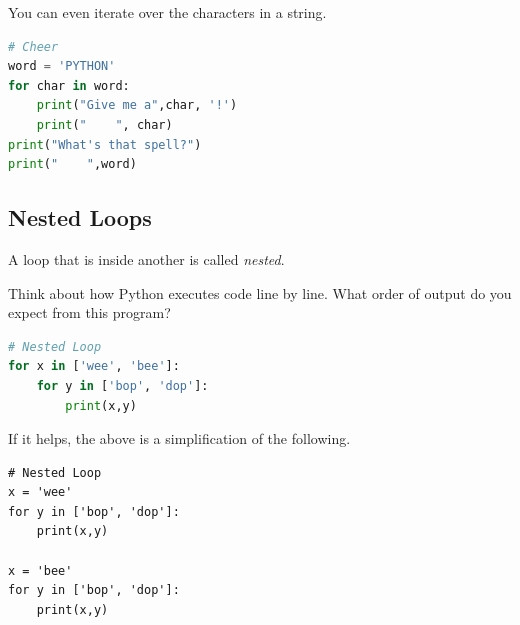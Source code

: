 \smallskip
\noindent You can even iterate over the characters in a string.

\begin{lstlisting}[language = Python]
# Cheer
word = 'PYTHON'
for char in word:
    print("Give me a",char, '!')
    print("    ", char)
print("What's that spell?")
print("    ",word) \end{lstlisting}


\subsection{Nested Loops}

A loop that is inside another is called \emph{nested}.

\smallskip
\noindent Think about how Python executes code line by line. What order of output do you expect from this program?


\begin{lstlisting}[language = Python]
# Nested Loop
for x in ['wee', 'bee']:
    for y in ['bop', 'dop']:
        print(x,y) \end{lstlisting}

If it helps, the above is a simplification of the following. 


\begin{lstlisting}
# Nested Loop
x = 'wee'
for y in ['bop', 'dop']:
    print(x,y) 

x = 'bee'
for y in ['bop', 'dop']:
    print(x,y)   
\end{lstlisting}



\smallskip
